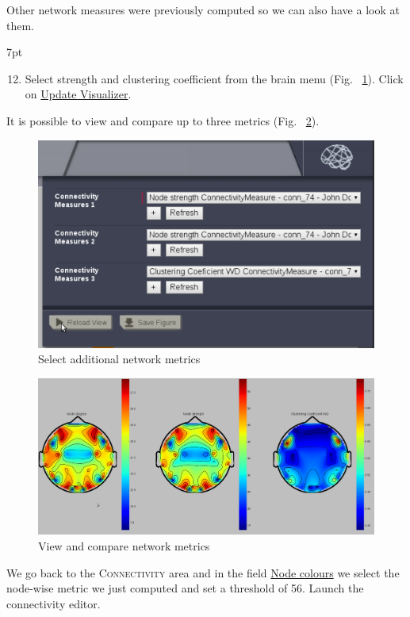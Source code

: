 \documentclass{tufte-handout}
\newenvironment{formal}{%
  \def\FrameCommand{%
    \hspace{1pt}%
    {\color{DarkBlue}\vrule width 2pt}%
    {\color{formalshade}\vrule width 4pt}%
    \colorbox{formalshade}%
  }%
  \MakeFramed{\advance\hsize-\width\FrameRestore}%
  \noindent\hspace{-4.55pt}%
  \begin{adjustwidth}{}{7pt}%
  \vspace{2pt}\vspace{2pt}%
}
{%
  \vspace{2pt}\end{adjustwidth}\endMakeFramed%
}
\begin{document}
\noindent Other network measures were previously computed so we can also have a look at them. 
\begin{formal}
  \begin{enumerate}[resume] %
  \setcounter{enumi}{11}
  \item Select strength and clustering coefficient from the brain menu (Fig. ~\ref{fig:step_05}). Click on \underline{Update Visualizer}.
  \end{enumerate}
\end{formal}
\noindent It is possible to view and compare up to three metrics (Fig. ~\ref{fig:step_05b}).
\begin{figure}[h]
  \includegraphics[width=0.5\linewidth]{Handout_UI_ModellingStructuralLesions_AnalysisView}%
  \caption{Select additional network metrics}%
  \label{fig:step_05}%
\end{figure}

\begin{figure}[h]
  \includegraphics[width=0.9\linewidth]{Handout_UI_ModellingStructuralLesions_AnalysisResultCompare}%
  \caption{View and compare network metrics}%
  \label{fig:step_05b}%
\end{figure}
\newpage

\noindent We go back to the \textsc{Connectivity} area and in the field \underline{Node colours} we select
the node-wise metric we just computed and set a threshold of 56. Launch the connectivity editor.
\end{document}
